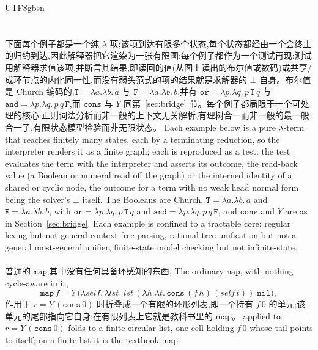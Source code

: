 \begin{CJK*}{UTF8}{gbsn}
  \section{}\label{app:dsl}
  \ifPaperChinese
  下面每个例子都是一个纯 $\lambda$-项;该项到达有限多个状态,每个状态都经由一个会终止的归约到达,因此解释器把它渲染为一张有限图;每个例子都作为一个测试再现:测试用解释器求值该项,并断言其结果,即读回的值(从图上读出的布尔值或数码)或共享/成环节点的内化同一性,而没有弱头范式的项的结果就是求解器的 $\bot$ 自身。布尔值是 Church 编码的,$\mathtt{T} = \lambda a.\lambda b.\,a$ 与 $\mathtt{F} = \lambda a.\lambda b.\,b$,并有 $\mathtt{or} = \lambda p.\lambda q.\,p\,\mathtt{T}\,q$ 与 $\mathtt{and} = \lambda p.\lambda q.\,p\,q\,\mathtt{F}$,而 $\mathtt{cons}$ 与 $Y$ 同第~\ref{sec:bridge} 节。每个例子都局限于一个可处理的核心:正则词法分析而非一般的上下文无关解析,有理树合一而非一般的最一般合一子,有限状态模型检验而非无限状态。
  \else
  Each example below is a pure $\lambda$-term that reaches finitely many states, each by a terminating reduction, so the interpreter renders it as a finite graph; each is reproduced as a test: the test evaluates the term with the interpreter and asserts its outcome, the read-back value (a Boolean or numeral read off the graph) or the interned identity of a shared or cyclic node, the outcome for a term with no weak head normal form being the solver's $\bot$ itself. The Booleans are Church, $\mathtt{T} = \lambda a.\lambda b.\,a$ and $\mathtt{F} = \lambda a.\lambda b.\,b$, with $\mathtt{or} = \lambda p.\lambda q.\,p\,\mathtt{T}\,q$ and $\mathtt{and} = \lambda p.\lambda q.\,p\,q\,\mathtt{F}$, and $\mathtt{cons}$ and $Y$ are as in Section~\ref{sec:bridge}. Each example is confined to a tractable core: regular lexing but not general context-free parsing, rational-tree unification but not a general most-general unifier, finite-state model checking but not infinite-state.
  \fi

  \paragraph{}
  \ifPaperChinese 普通的 $\mathtt{map}$,其中没有任何具备环感知的东西, \else The ordinary $\mathtt{map}$, with nothing cycle-aware in it, \fi
  \[
    \mathtt{map}\,f = Y\,\big(\lambda\mathit{self}.\,\lambda\mathit{lst}.\;
    \mathit{lst}\,(\lambda h.\lambda t.\,\mathtt{cons}\,(f\,h)\,(\mathit{self}\,t))\;\mathtt{nil}\big),
  \]
  \ifPaperChinese 作用于 $r = Y\,(\mathtt{cons}\,0)$ 时折叠成一个有限的环形列表,即一个持有 $f\,0$ 的单元;该单元的尾部指向它自身;在有限列表上它就是教科书里的 map。 \else applied to $r = Y\,(\mathtt{cons}\,0)$ folds to a finite circular list, one cell holding $f\,0$ whose tail points to itself; on a finite list it is the textbook map. \fi


\end{CJK*}
